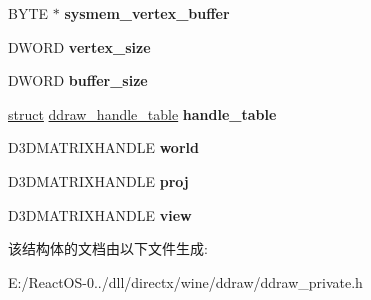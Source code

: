 \begin{DoxyCompactItemize}
\item 
\mbox{\label{structd3d__device_a477eb1ffc6989fde8ffebdc30a4978b3}} 
B\+Y\+TE $\ast$ {\bfseries sysmem\+\_\+vertex\+\_\+buffer}
\item 
\mbox{\label{structd3d__device_a65e2f5ddf52e6a9a26e3f3a692383fff}} 
D\+W\+O\+RD {\bfseries vertex\+\_\+size}
\item 
\mbox{\label{structd3d__device_abcc3a062421444e006f9d84924cf6bcd}} 
D\+W\+O\+RD {\bfseries buffer\+\_\+size}
\item 
\mbox{\label{structd3d__device_a30946d71f2f7d3066dbe2f0944942cb2}} 
\hyperlink{interfacestruct}{struct} \hyperlink{structddraw__handle__table}{ddraw\+\_\+handle\+\_\+table} {\bfseries handle\+\_\+table}
\item 
\mbox{\label{structd3d__device_a8cf454f14acdc4cf5b1caf11fa843bd6}} 
D3\+D\+M\+A\+T\+R\+I\+X\+H\+A\+N\+D\+LE {\bfseries world}
\item 
\mbox{\label{structd3d__device_a6f90d47753c393fc005ddc605b5e3a8b}} 
D3\+D\+M\+A\+T\+R\+I\+X\+H\+A\+N\+D\+LE {\bfseries proj}
\item 
\mbox{\label{structd3d__device_afb2a87656dad0f435248dc4cfad9cc03}} 
D3\+D\+M\+A\+T\+R\+I\+X\+H\+A\+N\+D\+LE {\bfseries view}
\end{DoxyCompactItemize}


该结构体的文档由以下文件生成\+:\begin{DoxyCompactItemize}
\item 
E\+:/\+React\+O\+S-\/0../dll/directx/wine/ddraw/ddraw\+\_\+private.\+h\end{DoxyCompactItemize}
